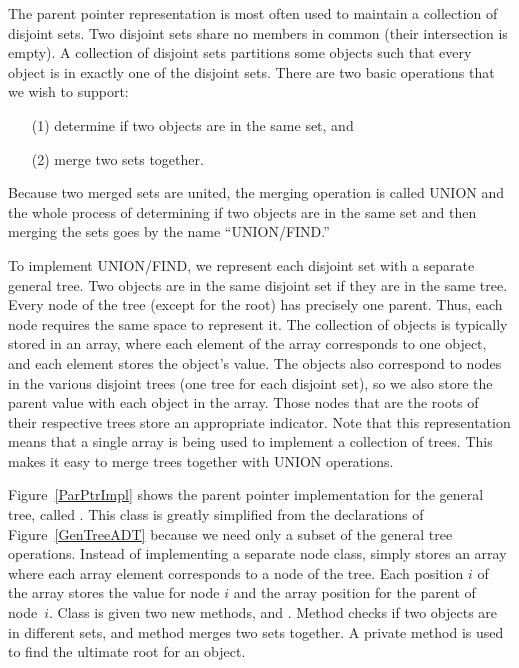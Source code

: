 The parent pointer representation is most often used to maintain a
collection of disjoint sets.
Two disjoint sets share no members in common (their intersection is
empty).
A collection of disjoint sets partitions some objects
such that every object is in exactly one of the disjoint sets.
There are two basic operations that we wish to support:
\begin{enumerate}
\item[(1)] determine if two objects are in the same set, and
\item[(2)]  merge two sets together.
\end{enumerate}
\noindent Because two merged sets are united, the merging operation is
called UNION and the whole process of determining if two
objects are in the same set and then merging the sets goes by the name
``UNION/FIND.''

To implement UNION/FIND, we represent each disjoint set with a
separate general tree.
Two objects are in the same disjoint set if they are in the same tree.
Every node of the tree (except for the root) has precisely one parent.
Thus, each node requires the same space to represent it.
The collection of objects is typically stored in an array, where each
element of the array corresponds to one object, and each element
stores the object's value.
The objects also correspond to nodes in the various disjoint trees
(one tree for each disjoint set), so we also store the parent value
with each object in the array.
Those nodes that are the roots of their respective trees store an
appropriate indicator.
Note that this representation means that a single array is being used
to implement a collection of trees.
This makes it easy to merge trees together with UNION operations.

Figure~\ref{ParPtrImpl} shows the parent pointer implementation for
the general tree, called .
This class is greatly simplified from the declarations of
Figure~\ref{GenTreeADT} because we need only a subset of the general
tree operations.
Instead of implementing a separate node class, 
simply stores an array where each array element corresponds to
a node of the tree.
Each position \(i\) of the array stores the value for node
\(i\) and the array position for the parent of node~\(i\).
Class  is given two new methods,  and
.
Method  checks if two objects are in different sets,
and method  merges two sets together.
A private method  is used to find the ultimate root for
an object.

